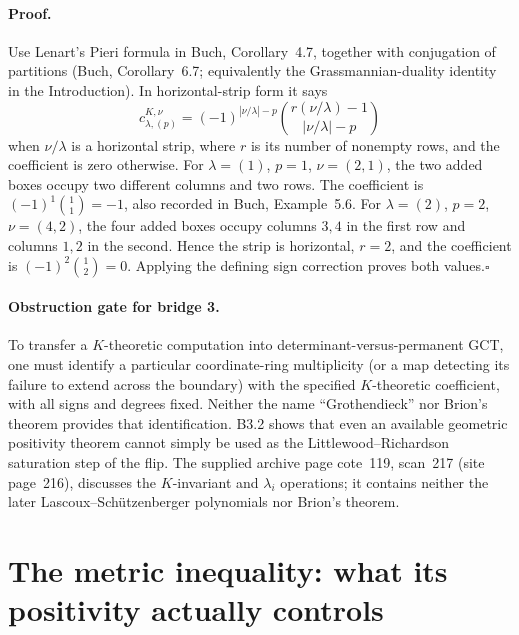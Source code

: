 \paragraph{Proof.}
Use Lenart's Pieri formula in Buch, Corollary~4.7, together with
conjugation of partitions (Buch, Corollary~6.7; equivalently the
Grassmannian-duality identity in the Introduction).  In horizontal-strip
form it says
\[
 c^{K,\nu}_{\lambda,(p)}=
 (-1)^{|\nu/\lambda|-p}
 \binom{r(\nu/\lambda)-1}{|\nu/\lambda|-p}
\]
when $\nu/\lambda$ is a horizontal strip, where $r$ is its number of
nonempty rows, and the coefficient is zero otherwise.  For
$\lambda=(1)$, $p=1$, $\nu=(2,1)$, the two added boxes occupy two
different columns and two rows.  The coefficient is
$(-1)^1\binom11=-1$, also recorded in Buch, Example~5.6.
For $\lambda=(2)$, $p=2$, $\nu=(4,2)$, the four added boxes occupy
columns $3,4$ in the first row and columns $1,2$ in the second.  Hence
the strip is horizontal, $r=2$, and the coefficient is
$(-1)^2\binom12=0$.  Applying the defining sign correction proves both
values.\hfill$\square$

\paragraph{Obstruction gate for bridge 3.}
To transfer a $K$-theoretic computation into determinant-versus-permanent
GCT, one must identify a particular coordinate-ring multiplicity (or a
map detecting its failure to extend across the boundary) with the
specified $K$-theoretic coefficient, with all signs and degrees fixed.
Neither the name ``Grothendieck'' nor Brion's theorem provides that
identification.  B3.2 shows that even an available geometric positivity
theorem cannot simply be used as the Littlewood--Richardson saturation
step of the flip.  The supplied archive page cote~119, scan~217
(site page~216), discusses the $K$-invariant and $\lambda_i$ operations;
it contains neither the later Lascoux--Sch\"utzenberger polynomials nor
Brion's theorem.

\section{The metric inequality: what its positivity actually controls}
\label{sec:bridge-metric}

